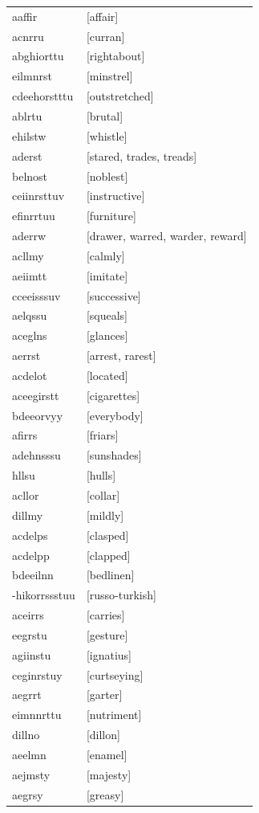 \documentclass{article}
\begin{document}
\begin{tabular}{ll}
aaffir & [affair] \\
acnrru & [curran] \\
abghiorttu & [rightabout] \\
eilmnrst & [minstrel] \\
cdeehorstttu & [outstretched] \\
ablrtu & [brutal] \\
ehilstw & [whistle] \\
aderst & [stared, trades, treads] \\
belnost & [noblest] \\
ceiinrsttuv & [instructive] \\
efinrrtuu & [furniture] \\
aderrw & [drawer, warred, warder, reward] \\
acllmy & [calmly] \\
aeiimtt & [imitate] \\
cceeisssuv & [successive] \\
aelqssu & [squeals] \\
aceglns & [glances] \\
aerrst & [arrest, rarest] \\
acdelot & [located] \\
aceegirstt & [cigarettes] \\
bdeeorvyy & [everybody] \\
afirrs & [friars] \\
adehnsssu & [sunshades] \\
hllsu & [hulls] \\
acllor & [collar] \\
dillmy & [mildly] \\
acdelps & [clasped] \\
acdelpp & [clapped] \\
bdeeilnn & [bedlinen] \\
-hikorrssstuu & [russo-turkish] \\
aceirrs & [carries] \\
eegrstu & [gesture] \\
agiinstu & [ignatius] \\
ceginrstuy & [curtseying] \\
aegrrt & [garter] \\
eimnnrttu & [nutriment] \\
dillno & [dillon] \\
aeelmn & [enamel] \\
aejmsty & [majesty] \\
aegrsy & [greasy] \\

\end{tabular}
\end{document}
